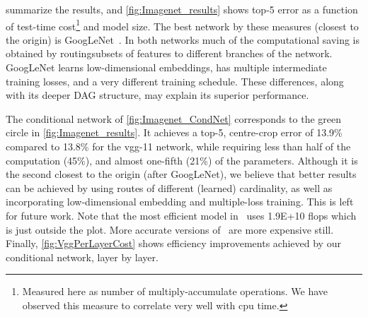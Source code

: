 \documentclass[thesis]{subfiles}
\begin{document}
	 summarize the results, and \cref{fig:Imagenet_results} shows top-5 error as a function of test-time cost\footnote{Measured here as number of multiply-accumulate operations. We have observed this measure to correlate very well with \gls{cpu} time.} and model size. The best network by these measures (\ie closest to the origin) is GoogLeNet~\citep{Szegedy2014going}. In both networks much of the computational saving is obtained by routingsubsets of features to different branches of the network. GoogLeNet learns low-dimensional embeddings, has multiple intermediate training losses, and a very different training schedule. These differences, along with its deeper DAG structure, may explain its superior performance.
	
	The conditional network of \cref{fig:Imagenet_CondNet} 
	corresponds to the green circle in \cref{fig:Imagenet_results}.
	It achieves a top-5, centre-crop error of
	13.9\% compared to 13.8\% for the \gls{vgg}-11 network, while requiring less than half of the computation (45\%),
	and almost one-fifth (21\%) of the parameters.
	Although it is the second closest to the origin (after GoogLeNet), we believe that better results can be achieved 
	by using routes of different (learned) cardinality, as well as incorporating low-dimensional embedding and multiple-loss training. This is left for future work. 
	Note that the most efficient model in~\citep{He2015b} uses 1.9E+10 flops which is just outside the plot. 
	More accurate versions of~\citep{He2015b} are more expensive still.
	Finally, \cref{fig:VggPerLayerCost} shows efficiency improvements achieved by our conditional network, layer by layer.
	
\end{document}
